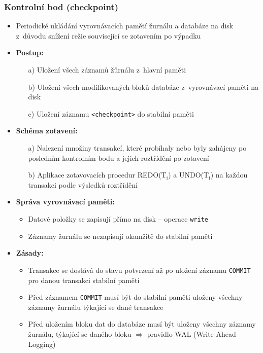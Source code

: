 \documentclass[a4paper,10pt]{article}
\newcommand{\pojem}[2]{\item \textbf{#1:}\quad #2}
\newcommand{\tedy}{$\Rightarrow$ }
\begin{document}
      \subsubsection{Kontrolní bod (checkpoint)}
        \begin{itemize}
          \item Periodické ukládání vyrovnávacích pamětí žurnálu a databáze na disk z~důvodu snížení režie související se zotavením po výpadku
          \pojem{Postup}
          \begin{itemize}
            \item[a)] Uložení všech záznamů žůrnálu z~hlavní paměti
            \item[b)] Uložení všech modifikovaných bloků databáze z~vyrovnávací paměti na disk
            \item[c)] Uložení záznamu \texttt{<checkpoint>} do stabilní paměti
          \end{itemize}
          \pojem{Schéma zotavení}
          \begin{itemize}
            \item[a)] Nalezení množiny transakcí, které probíhaly nebo byly zahájeny po posledním kontrolním bodu a jejich roztřídění po zotavení
            \item[b)] Aplikace zotavovacích procedur REDO(T$_\textrm{i}$) a UNDO(T$_\textrm{i}$) na každou transakci podle výsledků roztřídění
          \end{itemize}
          \begin{figure}[h!]
            \centering
          \end{figure}

          \pojem{Správa vyrovnávací paměti}
          \begin{itemize}
            \item Datové položky se zapisují přímo na disk -- operace \texttt{write}
            \item Záznamy žurnálu se nezapisují okamžitě do stabilní paměti
          \end{itemize}
          \pojem{Zásady}
          \begin{itemize}
            \item Transakce se dostává do stavu potvrzení až po uložení záznamu \texttt{COMMIT} pro danou transakci stabilní paměti
            \item Před záznamem \texttt{COMMIT} musí být do stabilní paměti uloženy všechny záznamy žurnálu týkající se dané transakce
            \item Před uložením bloku dat do databáze musí být uloženy všechny záznamy žurnálu, týkající se daného bloku \tedy pravidlo WAL (Write-Ahead-Logging)
          \end{itemize}
        \end{itemize}
\end{document}
